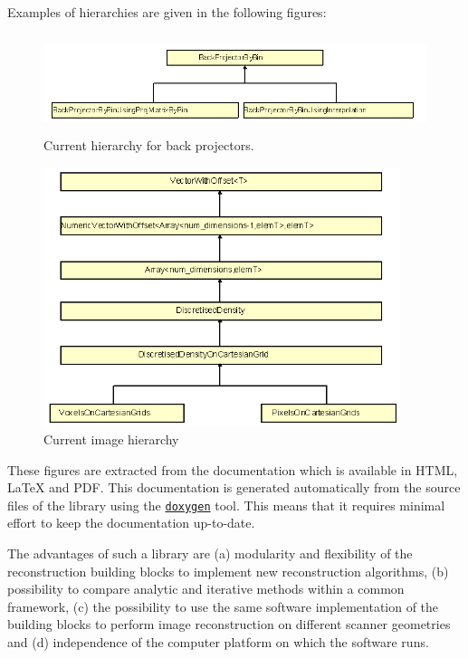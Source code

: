 \documentclass{article}
\def\R2Lurl#1#2{\mbox{\href{#1}{\tt #2}}}
\begin{document}
Examples of hierarchies are given in the following figures:
\begin{figure}[htbp]
\begin{center}
\includegraphics[width=5.667in, height=1.137in]{graphics/STIR-general-overviewFig1}
\caption{Current hierarchy for back projectors.}
\end{center}
\end{figure}


\begin{figure}[htbp]
\begin{center}
\includegraphics[width=4.100in, height=2.984in]{graphics/STIR-general-overviewFig2}
\caption{Current image hierarchy}
\end{center}
\end{figure}

These figures are extracted from the documentation which is available 
in HTML, LaTeX and PDF. This documentation is generated automatically 
from the source files of the library using the \R2Lurl{http://www.doxygen.org/ }{doxygen} 
tool. This means that it requires minimal effort to keep the 
documentation up-to-date.

The advantages of such a library are (a) modularity and flexibility 
of the reconstruction building blocks to implement new reconstruction 
algorithms, (b) possibility to compare analytic and iterative 
methods within a common framework, (c) the possibility to use 
the same software implementation of the building blocks to perform 
image reconstruction on different scanner geometries and (d) 
independence of the computer platform on which the software runs.
\end{document}
